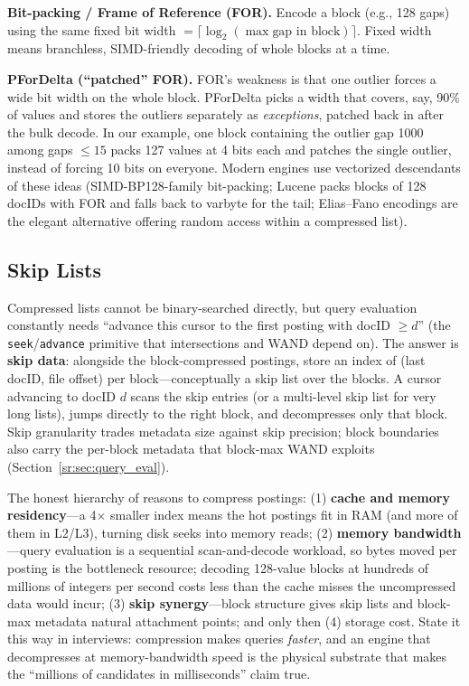 \textbf{Bit-packing / Frame of Reference (FOR).} Encode a block (e.g., 128 gaps) using the same fixed bit width $= \lceil \log_2(\max \text{gap in block}) \rceil$. Fixed width means branchless, SIMD-friendly decoding of whole blocks at a time.

\textbf{PForDelta (``patched'' FOR).} FOR's weakness is that one outlier forces a wide bit width on the whole block. PForDelta picks a width that covers, say, 90\% of values and stores the outliers separately as \emph{exceptions}, patched back in after the bulk decode. In our example, one block containing the outlier gap 1000 among gaps $\le 15$ packs 127 values at 4 bits each and patches the single outlier, instead of forcing 10 bits on everyone. Modern engines use vectorized descendants of these ideas (SIMD-BP128-family bit-packing; Lucene packs blocks of 128 docIDs with FOR and falls back to varbyte for the tail; Elias--Fano encodings are the elegant alternative offering random access within a compressed list).

\subsection{Skip Lists}

Compressed lists cannot be binary-searched directly, but query evaluation constantly needs ``advance this cursor to the first posting with docID $\ge d$'' (the \texttt{seek}/\texttt{advance} primitive that intersections and WAND depend on). The answer is \textbf{skip data}: alongside the block-compressed postings, store an index of (last docID, file offset) per block---conceptually a skip list over the blocks. A cursor advancing to docID $d$ scans the skip entries (or a multi-level skip list for very long lists), jumps directly to the right block, and decompresses only that block. Skip granularity trades metadata size against skip precision; block boundaries also carry the per-block metadata that block-max WAND exploits (Section~\ref{sr:sec:query_eval}).

\begin{keyinsight}
The honest hierarchy of reasons to compress postings: (1) \textbf{cache and memory residency}---a 4$\times$ smaller index means the hot postings fit in RAM (and more of them in L2/L3), turning disk seeks into memory reads; (2) \textbf{memory bandwidth}---query evaluation is a sequential scan-and-decode workload, so bytes moved per posting is the bottleneck resource; decoding 128-value blocks at hundreds of millions of integers per second costs less than the cache misses the uncompressed data would incur; (3) \textbf{skip synergy}---block structure gives skip lists and block-max metadata natural attachment points; and only then (4) storage cost. State it this way in interviews: compression makes queries \emph{faster}, and an engine that decompresses at memory-bandwidth speed is the physical substrate that makes the ``millions of candidates in milliseconds'' claim true.
\end{keyinsight}

